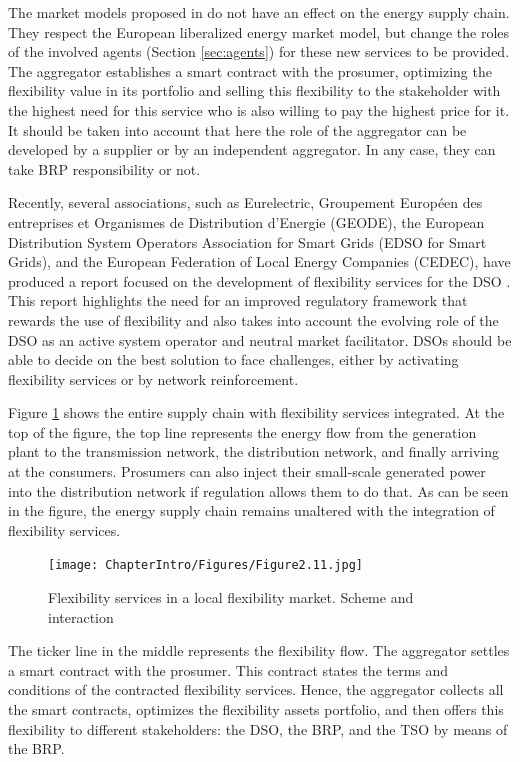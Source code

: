 The market models proposed in \cite{USEFFoundation2015a, MarketDesignENTSOE} do not have an effect on the energy supply chain. They respect the European liberalized energy market model, but change the roles of the involved agents (Section \ref{sec:agents}) for these new services to be provided. The aggregator establishes a smart contract with the prosumer, optimizing the flexibility value in its portfolio and selling this flexibility to the stakeholder with the highest need for this service who is also willing to pay the highest price for it. It should be taken into account that here the role of the aggregator can be developed by a supplier or by an independent aggregator. In any case, they can take BRP responsibility or not.

Recently, several associations, such as Eurelectric, Groupement Europ\'{e}en des entreprises et Organismes de Distribution d'Energie (GEODE), the European Distribution System Operators Association for Smart Grids (EDSO for Smart Grids), and the European Federation of Local Energy Companies (CEDEC), have produced a report focused on the development of flexibility services for the DSO \cite{edso2018flexibility}. This report highlights the need for an improved regulatory framework that rewards the use of flexibility and also takes into account the evolving role of the DSO as an active system operator and neutral market facilitator. DSOs should be able to decide on the best solution to face challenges, either by activating flexibility services or by network reinforcement.

Figure \ref{fig:211} shows the entire supply chain with flexibility services integrated. At the top of the figure, the top line represents the energy flow from the generation plant to the transmission network, the distribution network, and finally arriving at the consumers. Prosumers can also inject their small-scale generated power into the distribution network if regulation allows them to do that. As can be seen in the figure, the energy supply chain remains unaltered with the integration of flexibility services.

\begin{figure}[h]
	\centering
	\texttt{[image: ChapterIntro/Figures/Figure2.11.jpg]}
		\caption{Flexibility services in a local flexibility market. Scheme and interaction}  
	\label{fig:211}
\end{figure}

The ticker line in the middle represents the flexibility flow. The aggregator settles a smart contract with the prosumer. This contract states the terms and conditions of the contracted flexibility services. Hence, the aggregator collects all the smart contracts, optimizes the flexibility assets portfolio, and then offers this flexibility to different stakeholders: the DSO, the BRP, and the TSO by means of the BRP. 

